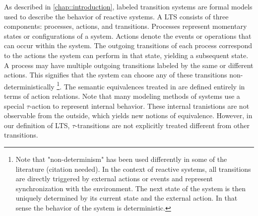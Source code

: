 %
\begin{isabellebody}%
%
%
\isadelimtheory
%
\endisadelimtheory
%
\isatagtheory
%
\endisatagtheory
{\isafoldtheory}%
%
\isadelimtheory
%
\endisadelimtheory
%
\isadelimdocument
%
\endisadelimdocument
%
\isatagdocument
%
\isamarkuptrue%
%
\endisatagdocument
{\isafolddocument}%
%
\isadelimdocument
%
\endisadelimdocument
%
\begin{isamarkuptext}%
\label{sec:LTS}%
\end{isamarkuptext}\isamarkuptrue%
%
\begin{isamarkuptext}%
As described in \cref{chap::introduction}, labeled transition systems are formal models used to describe the behavior of reactive systems.
A LTS consists of three components: processes, actions, and transitions. Processes represent momentary states or configurations of a system. 
Actions denote the events or operations that can occur within the system. The outgoing transitions of each process 
correspond to the actions the system can perform in that state, yielding a subsequent state. A process may have multiple outgoing transitions labeled by the same or different actions. This signifies that the system can choose any of these transitions non-deterministically
\footnote{Note that "non-determinism" has been used differently in some of the literature (citation needed). In the context of reactive systems, 
all transitions are directly triggered by external actions or events and represent synchronization with the environment.
The next state of the system is then uniquely determined by its current state and the external action. In that sense the behavior of the system is deterministic.}.
The semantic equivalences treated in \cite{GLABBEEK20013} are defined entirely in terms of action relations.
Note that many modeling methods of systems use a special $\tau$-action to represent internal behavior. These internal tranistions are not observable from the outside, which yields new notions of equivalence. However, in our definition of LTS, 
$\tau$-transitions are not explicitly treated different from other transitions.%
\end{isamarkuptext}\isamarkuptrue%
%
\isadelimdocument
%
\endisadelimdocument
%
\isatagdocument
%
\isamarkuptrue%
%
\endisatagdocument
{\isafolddocument}%
%
\isadelimdocument
%
\endisadelimdocument
%
\begin{isamarkuptext}%

\end{isamarkuptext}
\end{isabellebody}
